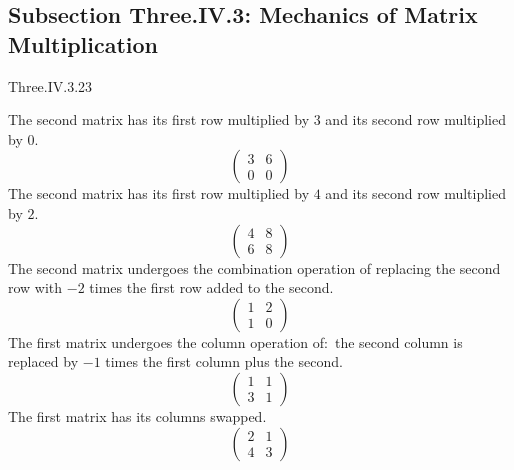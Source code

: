 \subsection{Subsection Three.IV.3: Mechanics of Matrix Multiplication}
\begin{ans}{Three.IV.3.23}
      \begin{exparts}
        \partsitem The second matrix has its first row multiplied
          by \( 3 \) and
          its second row multiplied by \( 0 \).
          \begin{equation*}
            \begin{pmatrix}
              3  &6  \\
              0  &0
            \end{pmatrix}
          \end{equation*}
        \partsitem The second matrix has its first row multiplied
          by \( 4 \) and
          its second row multiplied by \( 2 \).
          \begin{equation*}
            \begin{pmatrix}
              4  &8  \\
              6  &8
            \end{pmatrix}
          \end{equation*}
        \partsitem The second matrix undergoes the combination operation
          of replacing the second row with \( -2 \) times the first row added
          to the second.
          \begin{equation*}
            \begin{pmatrix}
              1  &2  \\
              1  &0
            \end{pmatrix}
          \end{equation*}
        \partsitem The first matrix undergoes the column operation of:~the
          second column is replaced by $-1$ times the first column plus the
          second.
          \begin{equation*}
            \begin{pmatrix}
              1  &1  \\
              3  &1
            \end{pmatrix}
          \end{equation*}
        \partsitem The first matrix has its columns swapped.
          \begin{equation*}
            \begin{pmatrix}
              2  &1  \\
              4  &3
            \end{pmatrix}
          \end{equation*}
      \end{exparts}
    
\end{ans}
